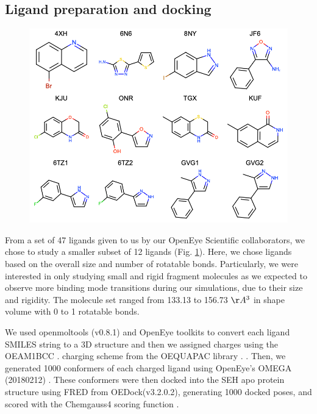 \subsection{Ligand preparation and docking}
\begin{figure}
    \centering
    \includegraphics{chapter6/Figures/2dmolecules.png}
    \caption{}
    \label{fig:2dmolecules}
\end{figure}
From a set of 47 ligands given to us by our OpenEye Scientific collaborators, we chose to study a smaller subset of 12 ligands (Fig. \ref{fig:2dmolecules}).
Here, we chose ligands based on the overall size and number of rotatable bonds.
Particularly, we were interested in only studying small and rigid fragment molecules as we expected to observe more binding mode transitions during our simulations, due to their size and rigidity.
The molecule set ranged from 133.13 to 156.73 ${\AA^{3}}$ in shape volume with 0 to 1 rotatable bonds.

We used openmoltools (v0.8.1) \cite{} and OpenEye toolkits \cite{openeye_toolkit} to convert each ligand SMILES string to a 3D structure and then we assigned charges using the OEAM1BCC \cite{jakalian_fast_2002}. charging scheme from the OEQUAPAC library \cite{jakalian_fast_2002}. .
Then, we generated 1000 conformers of each charged ligand using OpenEye’s OMEGA (20180212) \cite{hawkins_conformer_2010}.
These conformers were then docked into the SEH apo protein structure using FRED from OEDock(v3.2.0.2), generating 1000 docked poses, and scored with the Chemgauss4 scoring function \cite{mcgann_fred_2011}.

